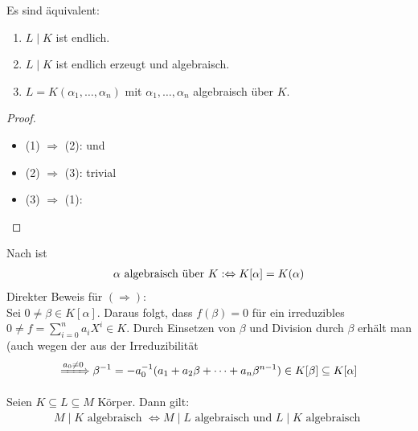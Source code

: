 
\begin{conclusion}
	Es sind äquivalent:
	\begin{enumerate}
		\item $L \mid K$ ist endlich.
		\item $L \mid K$ ist endlich erzeugt und algebraisch.
		\item $L = K(\alpha_1, \dots , \alpha_n)$ mit $\alpha_1, \dots, \alpha_n$ algebraisch über $K$.
	\end{enumerate}
\end{conclusion}

\begin{proof}
	\begin{itemize}
		\item (1) $\Rightarrow$ (2):  und 
		\item (2) $\Rightarrow$ (3): trivial
		\item (3) $\Rightarrow$ (1): 
	\end{itemize}
\end{proof}

\begin{remark}
	Nach  ist
	\begin{align}
	\alpha \text{ algebraisch über } K :\Leftrightarrow K[\alpha] = K(\alpha) \notag
	\end{align}
	Direkter Beweis für $(\Rightarrow)$: \\
	Sei $0 \neq \beta \in K[\alpha]$. Daraus folgt, dass $f(\beta) = 0$ für ein irreduzibles $0 \neq f = \sum_{i=0}^n a_i X^i \in K$. Durch Einsetzen von $\beta$ und Division durch $\beta$ erhält man (auch wegen der aus der Irreduzibilität
	\begin{align}
	\xRightarrow{a_0 \neq 0}\beta^{-1} = -a_0^{-1} ( a_1 + a_2 \beta + \dots + a_n \beta^{n-1}) \in K[\beta] \subseteq K[\alpha] \notag
	\end{align}
\end{remark}
\begin{proposition}
	Seien $K \subseteq L \subseteq M$ Körper. Dann gilt:
	\begin{align*}
		M\mid K \text{ algebraisch } \Leftrightarrow M\mid L \text{ algebraisch und } L \mid K \text{ algebraisch }
	\end{align*}
\end{proposition}

